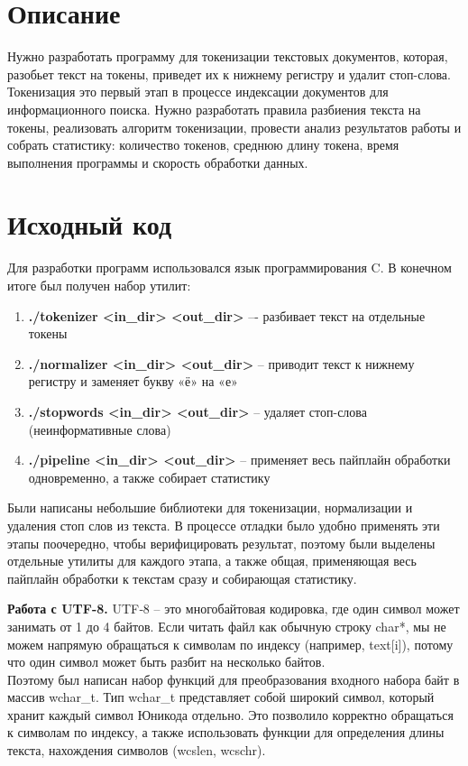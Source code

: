 \section{Описание}
Нужно разработать программу для токенизации текстовых документов, которая, разобьет текст на токены, приведет их к нижнему регистру и удалит стоп-слова. Токенизация это первый этап в процессе индексации документов для информационного поиска. Нужно разработать правила разбиения текста на токены, реализовать алгоритм токенизации, провести анализ результатов работы и собрать статистику: количество токенов, среднюю длину токена, время выполнения программы и скорость обработки данных.

\pagebreak

\section{Исходный код}
Для разработки программ использовался язык программирования C. В конечном итоге был получен набор утилит:

\begin{enumerate}
    \item \textbf{./tokenizer <in\_dir> <out\_dir>} –- разбивает текст на отдельные токены
    \item \textbf{./normalizer <in\_dir> <out\_dir>} -- приводит текст к нижнему регистру и заменяет букву «ё» на «е»
    \item \textbf{./stopwords <in\_dir> <out\_dir>} -- удаляет стоп-слова (неинформативные слова)
    \item \textbf{./pipeline <in\_dir> <out\_dir>} -- применяет весь пайплайн обработки одновременно, а также собирает статистику
\end{enumerate}

Были написаны небольшие библиотеки для токенизации, нормализации и удаления стоп слов из текста. В процессе отладки было удобно применять эти этапы поочередно, чтобы верифицировать результат, поэтому были выделены отдельные утилиты для каждого этапа, а также общая, применяющая весь пайплайн обработки к текстам сразу и собирающая статистику.

\vspace{1 em}
\noindent\textbf{Работа с UTF-8.} UTF‑8 -- это многобайтовая кодировка, где один символ может занимать от 1 до 4 байтов. Если читать файл как обычную строку char*, мы не можем напрямую обращаться к символам по индексу (например, text[i]), потому что один символ может быть разбит на несколько байтов. \\
Поэтому был написан набор функций для преобразования входного набора байт в массив wchar\_t. Тип wchar\_t представляет собой широкий символ, который хранит каждый символ Юникода отдельно. Это позволило корректно обращаться к символам по индексу, а также использовать функции для определения длины текста, нахождения символов (wcslen, wcschr).

